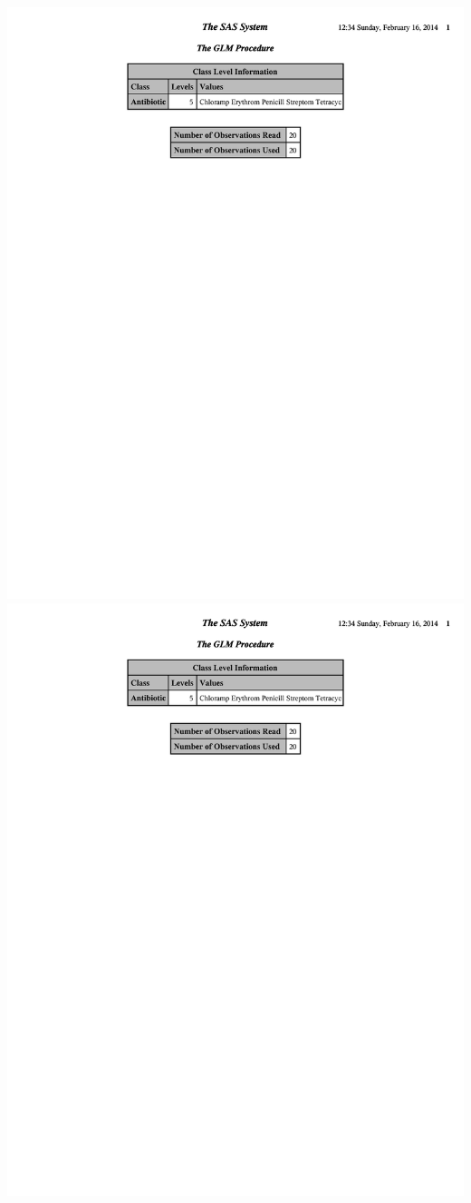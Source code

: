 \begin{center}
\includegraphics[scale=0.65,page=6,trim=60mm 80mm 30mm 0mm ]{BindFracContrasts}\includegraphics[scale=0.65,page=8,trim=30mm 80mm 60mm 0mm ]{BindFracContrasts}
\end{center}

